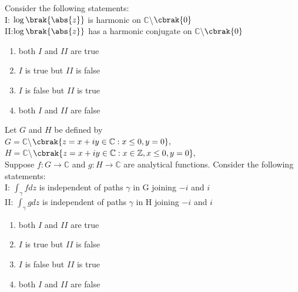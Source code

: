 \iffalse
	\title{2020-MA-14-26}
	\author{EE24Btech11006 - Arnav Mahishi}
	\section{ma}
	\chapter{2020}
\fi
\item{
Consider the following statements:\\
I: $\log\brak{\abs{z}}$ is harmonic on $\mathbb{C}$\textbackslash$\cbrak{0}$\\
II:$\log\brak{\abs{z}}$ has a harmonic conjugate on $\mathbb{C}$\textbackslash$\cbrak{0}$
\begin{multicols}{2}
\begin{enumerate}
\item both $I$ and $II$ are true
\item $I$ is true but $II$ is false
\item $I$ is false but $II$ is true
\item both $I$ and $II$ are false
\end{enumerate}
\end{multicols}
}
\item{
Let $G$ and $H$ be defined by\\
$G=\mathbb{C}$\textbackslash$\cbrak{z=x+iy\in\mathbb{C}:x\leq 0,y=0},$\\
$H=\mathbb{C}$\textbackslash$\cbrak{z=x+iy\in\mathbb{C}:x\in\mathbb{Z},x\leq 0,y=0},$\\
Suppose $f:G\rightarrow\mathbb{C}$ and $g:H\rightarrow\mathbb{C}$ are analytical functions. Consider the following statements:\\
I: $\int_{\gamma}fdz$ is independent of paths $\gamma$ in G joining $-i$ and $i$\\
II: $\int_{\gamma}gdz$ is independent of paths $\gamma$ in H joining $-i$ and $i$
\begin{multicols}{2}
\begin{enumerate}
\item both $I$ and $II$ are true
\item $I$ is true but $II$ is false
\item $I$ is false but $II$ is true
\item both $I$ and $II$ are false
\end{enumerate}
\end{multicols}}
